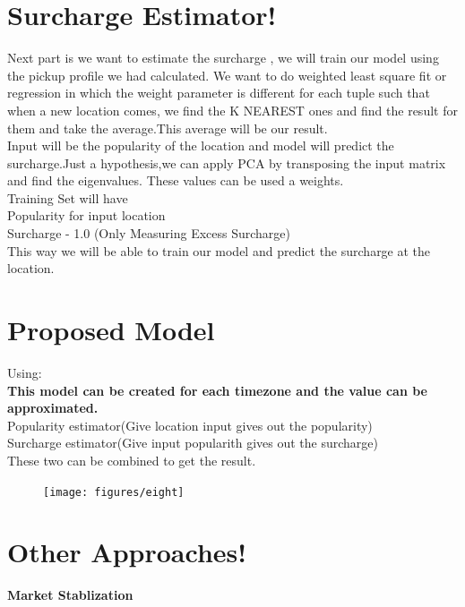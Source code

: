 \documentclass{article}
\begin{document}
\section{Surcharge Estimator!}
  
 Next part is we want to estimate the surcharge , we will train our model using the pickup profile we had calculated.
 We want to do weighted least square fit or regression in which the weight parameter is different for each tuple such that when a new location comes, we find the K NEAREST ones and find the result for them and take the average.This average will be our result.
\\Input will be the popularity of the location and model will predict the surcharge.Just a hypothesis,we can apply PCA by transposing the input matrix and find the eigenvalues.
 These values can be used a weights.
 \\ Training Set will have
 \\ Popularity for input location
 \\ Surcharge - 1.0 (Only Measuring Excess Surcharge)
 \\ This way we will be able to train our model and predict the surcharge at the location.
 
\section{Proposed Model}


Using:
\\ \textbf{This model can be created for each timezone and the value can be approximated.}
\\Popularity estimator(Give location input gives out the popularity)
\\Surcharge estimator(Give input popularith gives out the surcharge)
\\These two can be combined to get the result.

\begin{figure}[h!]
\begin{center}
\texttt{[image: figures/eight]}
\end{center}
\end{figure}

\section{Other Approaches!}
\textbf{Market Stablization}
\end{document}
